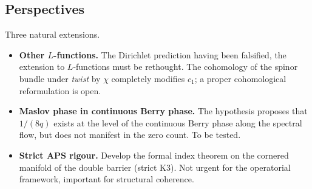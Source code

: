 \subsection{Perspectives}
\label{sec:perspectives}

Three natural extensions.

\begin{itemize}[nosep,leftmargin=*]
\item \textbf{Other $L$-functions.} The Dirichlet prediction having
been falsified, the extension to $L$-functions must be rethought.
The cohomology of the spinor bundle under \emph{twist} by $\chi$
completely modifies $c_1$; a proper cohomological reformulation is
open.
\item \textbf{Maslov phase in continuous Berry phase.}
The hypothesis proposes that $1/(8q)$ exists at the level of the
continuous Berry phase along the spectral flow, but does not
manifest in the zero count. To be tested.
\item \textbf{Strict APS rigour.} Develop the formal index theorem
on the cornered manifold of the double barrier (strict K3). Not
urgent for the operatorial framework, important for structural
coherence.
\end{itemize}
